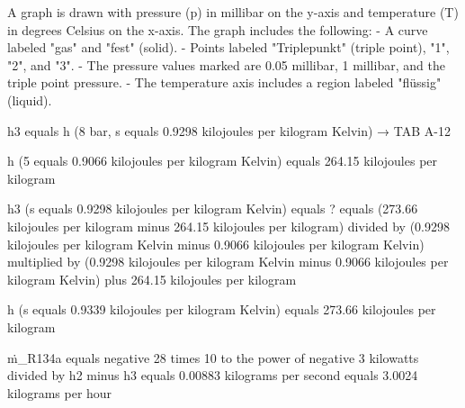 A graph is drawn with pressure (p) in millibar on the y-axis and temperature (T) in degrees Celsius on the x-axis. The graph includes the following:  
- A curve labeled "gas" and "fest" (solid).  
- Points labeled "Triplepunkt" (triple point), "1", "2", and "3".  
- The pressure values marked are 0.05 millibar, 1 millibar, and the triple point pressure.  
- The temperature axis includes a region labeled "flüssig" (liquid).

h3 equals h (8 bar, s equals 0.9298 kilojoules per kilogram Kelvin) → TAB A-12  

h (5 equals 0.9066 kilojoules per kilogram Kelvin) equals 264.15 kilojoules per kilogram  

h3 (s equals 0.9298 kilojoules per kilogram Kelvin) equals ?  
equals (273.66 kilojoules per kilogram minus 264.15 kilojoules per kilogram) divided by (0.9298 kilojoules per kilogram Kelvin minus 0.9066 kilojoules per kilogram Kelvin) multiplied by (0.9298 kilojoules per kilogram Kelvin minus 0.9066 kilojoules per kilogram Kelvin) plus 264.15 kilojoules per kilogram  

h (s equals 0.9339 kilojoules per kilogram Kelvin) equals 273.66 kilojoules per kilogram  

ṁ_R134a equals negative 28 times 10 to the power of negative 3 kilowatts divided by h2 minus h3  
equals 0.00883 kilograms per second  
equals 3.0024 kilograms per hour